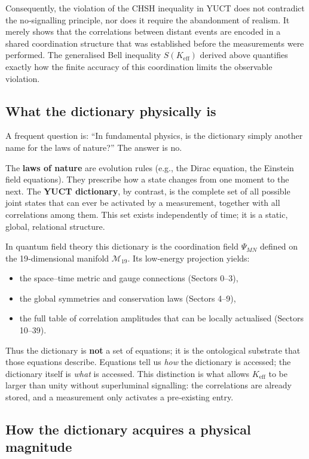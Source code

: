 \documentclass[12pt,a4paper]{article}
\theoremstyle{remark}
\begin{document}
Consequently, the violation of the CHSH inequality in YUCT does not
contradict the no‑signalling principle, nor does it require the abandonment
of realism.  It merely shows that the correlations between distant events
are encoded in a shared coordination structure that was established before
the measurements were performed.  The generalised Bell inequality
$S(K_{\mathrm{eff}})$ derived above quantifies exactly how the finite
accuracy of this coordination limits the observable violation.


\subsection*{What the dictionary physically is}

A frequent question is: ``In fundamental physics, is the dictionary
simply another name for the laws of nature?''  The answer is no.

The \textbf{laws of nature} are evolution rules (e.g., the Dirac equation,
the Einstein field equations).  They prescribe how a state changes from one
moment to the next.  The \textbf{YUCT dictionary}, by contrast, is the
complete set of all possible joint states that can ever be activated by a
measurement, together with all correlations among them.  This set exists
independently of time; it is a static, global, relational structure.

In quantum field theory this dictionary is the coordination field
$\Psi_{MN}$ defined on the 19‑dimensional manifold $\mathcal{M}_{19}$.
Its low‑energy projection yields:
\begin{itemize}
	\item the space–time metric and gauge connections (Sectors 0--3),
	\item the global symmetries and conservation laws (Sectors 4--9),
	\item the full table of correlation amplitudes that can be locally
	actualised (Sectors 10--39).
\end{itemize}
Thus the dictionary is \textbf{not} a set of equations; it is the
ontological substrate that those equations describe.  Equations tell us
\emph{how} the dictionary is accessed; the dictionary itself is
\emph{what} is accessed.  This distinction is what allows $K_{\mathrm{eff}}$
to be larger than unity without superluminal signalling: the correlations
are already stored, and a measurement only activates a pre‑existing entry.

\subsection*{How the dictionary acquires a physical magnitude}
\end{document}
